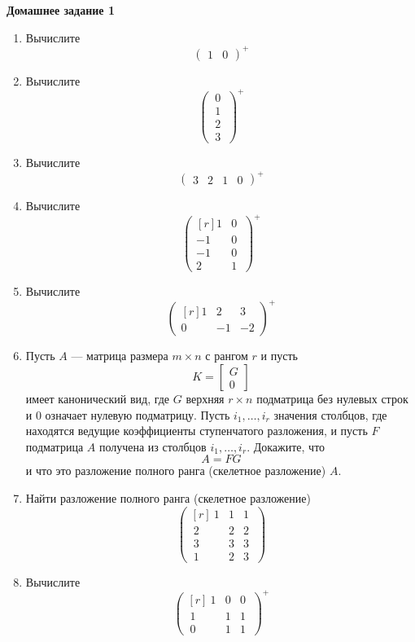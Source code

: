 \documentclass[12pt]{article}
\theoremstyle{definition}
\numberwithin{equation}{section}
\begin{document}
	\textbf{Домашнее задание 1}\begin{enumerate}
		\item Вычислите \[\begin{pmatrix} 1&0\end{pmatrix}^+\]
		\item Вычислите \[\begin{pmatrix} ~0~\\~1~\\~2~\\~3~\end{pmatrix}^+\]
		\item Вычислите \[\begin{pmatrix} 3&2&1&0 \end{pmatrix}^+\]
		\item Вычислите \[\begin{pmatrix}[r] 1&0~\\-1 & 0~\\-1 & 0~\\ 2&1~\end{pmatrix}^+\]
		\item Вычислите  \[\begin{pmatrix}[r] 1&2&3\\0 & -1 & -2\end{pmatrix}^+\]
		\item Пусть $A $ --- матрица размера $m\times n$
		с рангом $r$ и пусть
		$$
		K = \left[ \begin{array}{c} G \\ \hline  0\end{array} \right]
		$$
		имеет канонический вид,
		где $G$ верхняя $r\times n$ подматрица без нулевых строк и
		$0$ означает нулевую подматрицу. Пусть $i_1, \dots ,i_r$ значения столбцов, где находятся ведущие коэффициенты ступенчатого разложения, и пусть $F$ подматрица $A$ получена из столбцов $i_1,
		\dots , i_r$.  Докажите, что
		$$
		A = FG
		$$
		и что это разложение полного ранга (скелетное разложение) $A$.
		\item Найти разложение полного ранга (скелетное разложение)
		\[\begin{pmatrix}[r] ~1&1&1~\\~2 & 2 & 2~\\~3 & 3 & 3~\\ ~1&2&3~\end{pmatrix}\]
		\item Вычислите  \[\begin{pmatrix}[r] ~1&0&0~\\~1 & 1 & 1~\\~0 & 1 & 1~\end{pmatrix}^+\]

\end{enumerate}
\end{document}
